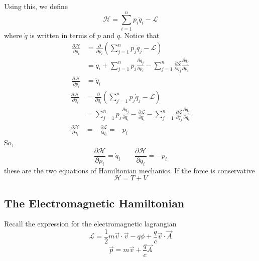 \documentclass[12pt,a4paper]{report}
\newcommand{\parder}[2]{\frac{\partial#1}{\partial#2}}
\newcommand{\lagrangian}{\mathcal{L}}
\newcommand{\hamiltonian}{\mathcal{H}}
\begin{document}
Using this, we define
\begin{equation*}
    \hamiltonian = \sum_{i=1}^{n}p_i\dot{q}_i - \lagrangian
\end{equation*}
where $\dot{q}$ is written in terms of $p$ and $q$.
Notice that
\begin{align*}
    \parder{\hamiltonian}{p_i} &= \parder{}{p_i}\left( \sum_{j=1}^{n} p_j\dot{q}_j - \lagrangian \right) \\
    &= \dot{q}_i + \sum_{j=1}^{n} p_j \parder{\dot{q}_j}{p_i} - \sum_{j=1}^{n} \parder{\lagrangian}{\dot{q}_j} \parder{\dot{q}_j}{p_i} \\
    \parder{\hamiltonian}{p_i} &= \dot{q}_i
\end{align*}
\begin{align*}
    \parder{\hamiltonian}{q_i} &= \parder{}{q_i}\left( \sum_{j=1}^{n} p_j\dot{q}_j - \lagrangian \right) \\
    &= \sum_{j=1}^{n} p_j\parder{\dot{q}_j}{q_i} - \parder{\lagrangian}{q_i} - \sum_{j=1}^{n} \parder{\lagrangian}{\dot{q}_j} \parder{\dot{q}_j}{q_i} \\
    \parder{\hamiltonian}{q_i} &= - \parder{\lagrangian}{q_i} = -p_i
\end{align*}
So,
\begin{equation*}
    \parder{\hamiltonian}{p_i} = \dot{q}_i \qquad \parder{\hamiltonian}{q_i} = -p_i
\end{equation*}
these are the two equations of Hamiltonian mechanics.
If the force is conservative 
\begin{equation*}
    \hamiltonian = T + V
\end{equation*}

\subsection{The Electromagnetic Hamiltonian}

Recall the expression for the electromagnetic lagrangian
\begin{equation*}
    \lagrangian = \frac{1}{2} m \vec{v}\cdot\vec{v} - q\phi + \frac{q}{c}\vec{v}\cdot\vec{A}
\end{equation*}
\begin{equation*}
    \vec{p} = m\vec{v} + \frac{q}{c}\vec{A}
\end{equation*}
\end{document}
